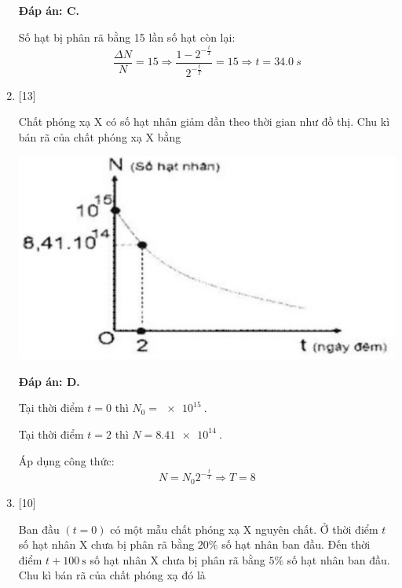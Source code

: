 \begin{enumerate}[label=\bfseries Câu \arabic*:]
	\loigiai
	{		\textbf{Đáp án: C.}
		
		Số hạt bị phân rã bằng 15 lần số hạt còn lại:
		$$\dfrac{\Delta N}{N} = 15 \Rightarrow \dfrac{1-2^{-\frac{t}{T}}}{2^{-\frac{t}{T}}} = 15 \Rightarrow t = \SI{34.0}{s}$$
		
	}
	\item {} [13]
	
	\cauhoi
	{
		Chất phóng xạ X có số hạt nhân giảm dần theo thời gian như đồ thị. Chu kì bán rã của chất phóng xạ X bằng
		\begin{center}
			\includegraphics[scale=0.8]{../figs/VN12-2021-PH-TP038-1}
		\end{center}
		
	}
	
	\loigiai
	{		\textbf{Đáp án: D.}
		
		Tại thời điểm $t=0$ thì $N_0 = \SI{e15}{}$.
		
		Tại thời điểm $t=2$ thì $N=\SI{8.41e14}{}$.
		
		Áp dụng công thức:
		$$N=N_0 2^{-\frac{t}{T}} \Rightarrow T = 8$$
		
	}
	\item {} [10]
	
	\cauhoi
	{Ban đầu $(t=0)$ có một mẫu chất phóng xạ X nguyên chất. Ở thời điểm $t$ số hạt nhân X chưa bị phân rã bằng $20\%$ số hạt nhân ban đầu. Đến thời điểm $t+100\ \text{s}$ số hạt nhân X chưa bị phân rã bằng $5\%$ số hạt nhân ban đầu. Chu kì bán rã của chất phóng xạ đó là
	}
	

\end{enumerate}

